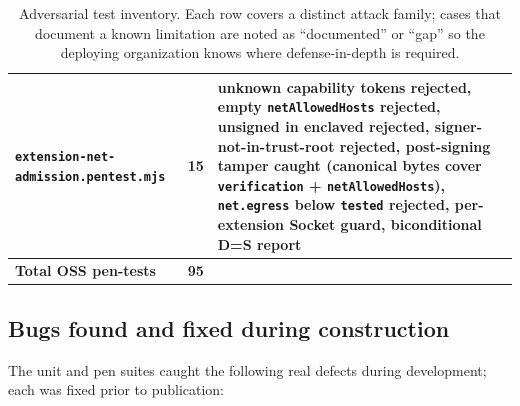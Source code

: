 \documentclass[11pt]{article}
\begin{document}
\begin{table}[t]
\begin{tabular}{|l|r|p{7cm}|}
    \hline
    \texttt{extension-net-admission.pentest.mjs} & 15 & unknown capability tokens rejected, empty \texttt{netAllowedHosts} rejected, unsigned in enclaved rejected, signer-not-in-trust-root rejected, post-signing tamper caught (canonical bytes cover \texttt{verification} + \texttt{netAllowedHosts}), \texttt{net.egress} below \texttt{tested} rejected, per-extension Socket guard, biconditional D=S report \\
    \hline
    \textbf{Total OSS pen-tests} & \textbf{95} & \\
    \hline
  \end{tabular}
  \caption{Adversarial test inventory. Each row covers a distinct
  attack family; cases that document a known limitation are noted as
  ``documented'' or ``gap'' so the deploying organization knows where
  defense-in-depth is required.}
  \label{tab:pen}
\end{table}

\subsection{Bugs found and fixed during construction}

The unit and pen suites caught the following real defects during
development; each was fixed prior to publication:
\end{document}
